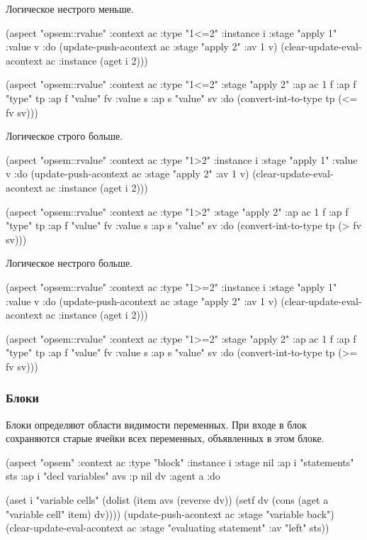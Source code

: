 \documentclass[12pt,twoside,russian]{article}
\begin{document}
Логическое нестрого меньше.

\begin{ABMLCode}
(aspect "opsem::rvalue" :context ac :type "1<=2" :instance i 
  :stage "apply 1" :value v :do 
  (update-push-acontext ac :stage "apply 2" :av 1 v)
  (clear-update-eval-acontext ac :instance (aget i 2)))

(aspect "opsem::rvalue" :context ac :type "1<=2" :stage "apply 2" 
    :ap ac 1 f :ap f "type" tp :ap f "value" fv :value s 
    :ap s "value" sv :do 
    (convert-int-to-type tp (<= fv sv)))
\end{ABMLCode}

Логическое строго больше.

\begin{ABMLCode}
(aspect "opsem::rvalue" :context ac :type "1>2" :instance i 
  :stage "apply 1" :value v :do 
  (update-push-acontext ac :stage "apply 2" :av 1 v)
  (clear-update-eval-acontext ac :instance (aget i 2)))

(aspect "opsem::rvalue" :context ac :type "1>2" :stage "apply 2" 
    :ap ac 1 f :ap f "type" tp :ap f "value" fv :value s 
    :ap s "value" sv :do 
    (convert-int-to-type tp (> fv sv)))
\end{ABMLCode}

Логическое нестрого больше.

\begin{ABMLCode}
(aspect "opsem::rvalue" :context ac :type "1>=2" :instance i 
  :stage "apply 1" :value v :do 
  (update-push-acontext ac :stage "apply 2" :av 1 v)
  (clear-update-eval-acontext ac :instance (aget i 2)))

(aspect "opsem::rvalue" :context ac :type "1>=2" :stage "apply 2" 
    :ap ac 1 f :ap f "type" tp :ap f "value" fv :value s 
    :ap s "value" sv :do 
    (convert-int-to-type tp (>= fv sv)))
\end{ABMLCode}


\subsubsection{Блоки}
Блоки определяют области видимости переменных. При входе в блок сохраняются старые ячейки всех переменных, объявленных в этом блоке.

\begin{ABMLCode}
(aspect "opsem" :context ac :type "block" :instance i :stage nil 
  :ap i "statements" sts :ap i "decl variables" avs :p nil dv 
  :agent a :do 
  
  (aset i "variable cells" (dolist 
    (item avs (reverse dv)) 
    (setf dv (cons (aget a "variable cell" item) dv))))
  (update-push-acontext ac :stage "variable back")
  (clear-update-eval-acontext ac :stage "evaluating statement" 
                                 :av "left" sts))
\end{ABMLCode}
\end{document}
